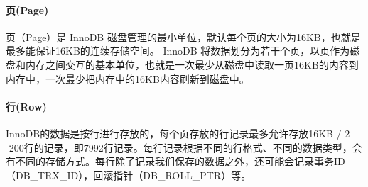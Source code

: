 \documentclass[../../../interview-questions.tex]{subfiles}
\begin{document}
\paragraph{页(Page)}

页（Page）是 InnoDB 磁盘管理的最小单位，默认每个页的大小为16KB，也就是最多能保证16KB的连续存储空间。
InnoDB 将数据划分为若干个页，以页作为磁盘和内存之间交互的基本单位，也就是一次最少从磁盘中读取一页16KB的内容到内存中，一次最少把内存中的16KB内容刷新到磁盘中。

\paragraph{行(Row)}

InnoDB的数据是按行进行存放的，每个页存放的行记录最多允许存放16KB / 2 -200行的记录，即7992行记录。每行记录根据不同的行格式、不同的数据类型，会有不同的存储方式。每行除了记录我们保存的数据之外，还可能会记录事务ID（DB\_TRX\_ID），回滚指针（DB\_ROLL\_PTR）等。
\end{document}
